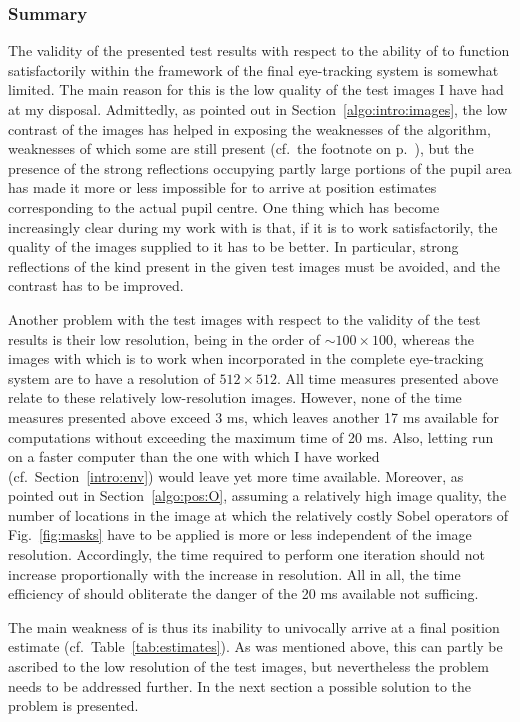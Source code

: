 \subsubsection{Summary}

The validity of the presented test results with respect to the ability
of {\octopus} to function satisfactorily within the framework of the
final eye-tracking system is somewhat limited.  The main reason for
this is the low quality of the test images I have had at my disposal.
Admittedly, as pointed out in Section~\ref{algo:intro:images}, the low
contrast of the images has helped in exposing the weaknesses of the
algorithm, weaknesses of which some are still present (cf.\ the
footnote on p.~\pageref{pg:TEproblems}), but the presence of the
strong reflections occupying partly large portions of the pupil area
has made it more or less impossible for {\octopus} to arrive at
position estimates corresponding to the actual pupil centre.  One
thing which has become increasingly clear during my work with
{\octopus} is that, if it is to work satisfactorily, the quality of
the images supplied to it has to be better.  In particular, strong
reflections of the kind present in the given test images must be
avoided, and the contrast has to be improved.

Another problem with the test images with respect to the validity of
the test results is their low resolution, being in the order of $\sim
100\times 100$, whereas the images with which {\octopus} is to work
when incorporated in the complete eye-tracking system are to have a
resolution of $512\times 512$.  All time measures presented above
relate to these relatively low-resolution images.  However, none of
the time measures presented above exceed 3 ms, which leaves another 17
ms available for computations without exceeding the maximum time of 20
ms.  Also, letting {\octopus} run on a faster computer than the one
with which I have worked (cf.\ Section~\ref{intro:env}) would leave
yet more time available.  Moreover, as pointed out in
Section~\ref{algo:pos:O}, assuming a relatively high image quality,
the number of locations in the image at which the relatively costly
Sobel operators of Fig.~\ref{fig:masks} have to be applied is more or
less independent of the image resolution.  Accordingly, the time
required to perform one iteration should not increase proportionally
with the increase in resolution.  All in all, the time efficiency of
{\octopus} should obliterate the danger of the 20 ms available not
sufficing.

The main weakness of {\octopus} is thus its inability to univocally
arrive at a final position estimate (cf.\ Table~\ref{tab:estimates}).
As was mentioned above, this can partly be ascribed to the low
resolution of the test images, but nevertheless the problem needs to
be addressed further.  In the next section a possible solution to the
problem is presented.

